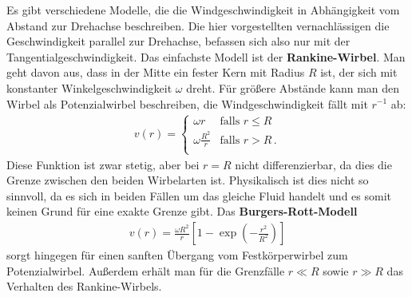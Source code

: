 \documentclass[12pt,a4paper,headinclude,bibtotoc]{scrartcl}
\begin{document}
Es gibt verschiedene Modelle, die die Windgeschwindigkeit in Abhängigkeit vom Abstand zur Drehachse beschreiben.
Die hier vorgestellten vernachlässigen die Geschwindigkeit parallel zur Drehachse, befassen sich also nur mit der Tangentialgeschwindigkeit.
Das einfachste Modell ist der \textbf{Rankine-Wirbel}.
Man geht davon aus, dass in der Mitte ein fester Kern mit Radius $R$ ist, der sich mit konstanter Winkelgeschwindigkeit $\omega$ dreht.
Für größere Abstände kann man den Wirbel als Potenzialwirbel beschreiben, die Windgeschwindigkeit fällt mit $r^{-1}$ ab:
\begin{align}
	v(r) = 
	\begin{cases}
		\omega r & \text{falls } r \leq R\\
		\omega \frac{R^2}{r} & \text{falls } r > R\,.\\
	\end{cases}
\end{align}
Diese Funktion ist zwar stetig, aber bei $r=R$ nicht differenzierbar, da dies die Grenze zwischen den beiden Wirbelarten ist.
Physikalisch ist dies nicht so sinnvoll, da es sich in beiden Fällen um das gleiche Fluid handelt und es somit keinen Grund für eine exakte Grenze gibt. 
Das \textbf{Burgers-Rott-Modell}
\begin{align}
	v(r) = \frac{\omega R^2}{r}\left[1-\exp\left(- \frac{r^2}{R^2}\right)\right]
\end{align}
sorgt hingegen für einen sanften Übergang vom Festkörperwirbel zum Potenzialwirbel.
Außerdem erhält man für die Grenzfälle $r \ll R$ sowie $r \gg R$ das Verhalten des Rankine-Wirbels.
\end{document}
